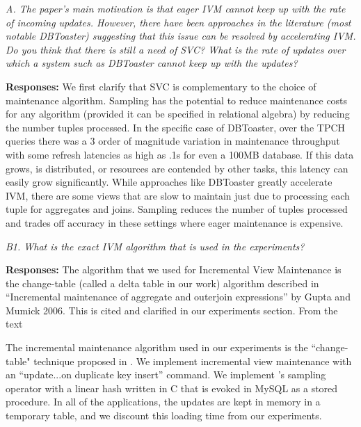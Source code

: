 \vspace{1em}
\emph{A. The paper's main motivation is that eager IVM cannot keep up with the rate of incoming updates. However, there have been approaches in the literature (most notable DBToaster) suggesting that this issue can be resolved by accelerating IVM. Do you think that there is still a need of SVC? What is the rate of updates over which a system such as DBToaster cannot keep up with the updates?}

\vspace{.25em}

{\bf Responses:} We first clarify that SVC is complementary to the choice of maintenance algorithm. Sampling has the potential to reduce maintenance costs for any algorithm (provided it can be specified in relational algebra) by reducing the number tuples processed. In the specific case of DBToaster, over the TPCH queries there was a 3 order of magnitude variation in maintenance throughput with some refresh latencies as high as .1s for even a 100MB database. If this data grows, is distributed, or resources are contended by other tasks, this latency can easily grow significantly. While approaches like DBToaster greatly accelerate IVM, there are some views that are slow to maintain just due to processing each tuple for aggregates and joins. Sampling reduces the number of tuples processed and trades off accuracy in these settings where eager maintenance is expensive. 

\vspace{1em}
\emph{B1. What is the exact IVM algorithm that is used in the experiments?}

\vspace{.25em}

{\bf Responses:} The algorithm that we used for Incremental View Maintenance is the change-table (called a delta table in our work) algorithm described in “Incremental maintenance of aggregate and outerjoin expressions” by Gupta and Mumick 2006. This is cited and clarified in our experiments section. From the text\begin{displayquote} 
The incremental maintenance algorithm used in our experiments is the ``change-table" technique proposed in \cite{gupta2006incremental}. We implement incremental view maintenance with an ``update...on duplicate key insert'' command. We implement \svc's sampling operator with a linear hash written in C that is evoked in MySQL as a stored procedure. In all of the applications, the updates are kept in memory in a temporary table, and we discount this loading time from our experiments.\end{displayquote} 


